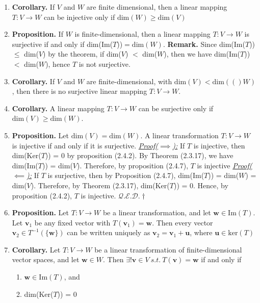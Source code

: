 \documentclass[oneside, 12pt]{book}
\newcommand{\settag}[1]{\renewcommand{\theenumi}{#1}}
\newcommand{\qed}{\hfill $\mathcal{Q}.\mathcal{E}.\mathcal{D}.\dagger$}
\newcommand{\tbf}[1]{\textbf{#1}}
\newcommand{\tit}[1]{\textit{#1}}
\newcommand{\proofforward}{\tit{\underline{Proof($\implies$):}}}
\newcommand{\proofback}{\tit{\underline{Proof($\impliedby$):}}}
\newcommand{\trans}[3]{$#1:#2\rightarrow{}#3$}
\newcommand{\dime}[1]{\text{dim}(#1)}
\newcommand{\para}[1]{\item \tbf{#1}}
\newcommand{\vv}{\mathbf{v}}
\newcommand{\vu}{\mathbf{u}}
\newcommand{\vw}{\mathbf{w}}
\begin{document}
\begin{enumerate}
        \settag{2.4.5}
        \para{Corollary.} If $V$ and $W$ are finite dimensional, then a linear mapping \trans{T}{V}{W} can be injective only if $\dime{W} \geq \dime{V}$
        
        \settag{2.4.7}
        \para{Proposition.} If $W$ is finite-dimensional, then a linear mapping \trans{T}{V}{W} is surjective if and only if dim(Im($T$))$ =\dime{W}$. \newline
        \textbf{Remark.} Since dim(Im($T$)) $\leq$ dim($V$) by the theorem, if dim($V$) $<$ dim($W$), then we have dim(Im($T$)) $<$ dim($W$), hence $T$ is not surjective.
        
        \settag{2.4.8}
        \para{Corollary.} If $V$ and $W$ are finite-dimensional, with $\dime{V} < \dime(W)$, then there is no surjective linear mapping \trans{T}{V}{W}.
        
        \settag{2.4.9}
        \para{Corollary.} A linear mapping \trans{T}{V}{W} can be surjective only if $\dime{V} \geq \dime{W}$.
        
        \settag{2.4.10}
        \para{Proposition.} Let $\dime{V} = \dime{W}$. A linear transformation \trans{T}{V}{W} is injective if and only if it is surjective. \newline
        \proofforward \newline
        If $T$ is injective, then dim(Ker($T$)) = 0 by proposition (2.4.2). By Theorem (2.3.17), we have dim(Im($T$)) = dim($V$). Therefore, by proposition (2.4.7), $T$ is injective \newline
        \proofback \newline
        If $T$ is surjective, then by Proposition (2.4.7), dim(Im($T$)) = dim($W$) = dim($V$). Therefore, by Theorem (2.3.17), dim(Ker($T$)) = 0. Hence, by proposition (2.4.2), $T$ is injective. \qed
        
        \settag{2.4.11}
        \para{Proposition.} Let \trans{T}{V}{W} be a linear transformation, and let $\vw \in \text{Im}(T)$. Let $\vv_1$ be any fixed vector with $T(\vv_1) = \vw$. Then every vector $\vv_2\in T^{-1}\left(\{\vw\}\right)$ can be written uniquely as $\vv_2 = \vv_1 + \vu$, where $\vu \in \text{ker}(T)$
        
        \settag{2.4.15}
        \para{Corollary.} Let \trans{T}{V}{W} be a linear transformation of finite-dimensional vector spaces, and let $\vw\in W$. Then $\exists! \vv \in V~s.t.~T(\vv) = \vw$ if and only if
        \begin{enumerate}
            \item $\vw \in \text{Im}(T)$, and
            \item dim(Ker($T$)) = $0$
        \end{enumerate}
        

\end{enumerate}
\end{document}
